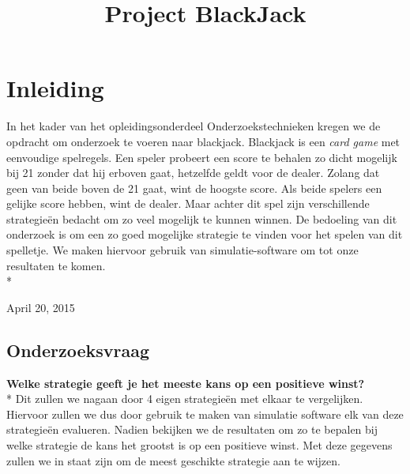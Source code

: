 \documentclass[conference]{IEEEtran}
\begin{document}
\title{Project BlackJack}
\author{
}
\maketitle

\IEEEpeerreviewmaketitle

\section{Inleiding}
In het kader van het opleidingsonderdeel Onderzoekstechnieken kregen we de opdracht om onderzoek te voeren naar blackjack. Blackjack is een {\it card game} met eenvoudige spelregels. Een speler probeert een score te behalen zo dicht mogelijk bij 21 zonder dat hij erboven gaat, hetzelfde geldt voor de dealer. Zolang dat geen van beide boven de 21 gaat, wint de hoogste score. Als beide spelers een gelijke score hebben, wint de dealer.
Maar achter dit spel zijn verschillende strategie\"en bedacht om zo veel mogelijk te kunnen winnen. De bedoeling van dit onderzoek is om een zo goed mogelijke strategie te vinden voor het spelen van dit spelletje. We maken hiervoor gebruik van simulatie-software om tot onze resultaten te komen.\\*
 
\hfill April 20, 2015

\subsection{Onderzoeksvraag}
\textbf{Welke strategie geeft je het meeste kans op een positieve winst?}\\*
Dit zullen we nagaan door 4 eigen strategie\"en met elkaar te vergelijken.
Hiervoor zullen we dus door gebruik te maken van simulatie software elk van deze strategie\"en evalueren.
Nadien bekijken we de resultaten om zo te bepalen bij welke strategie de kans het grootst is op een positieve winst. Met deze gegevens zullen we in staat zijn om de meest geschikte strategie aan te wijzen.
\end{document}

